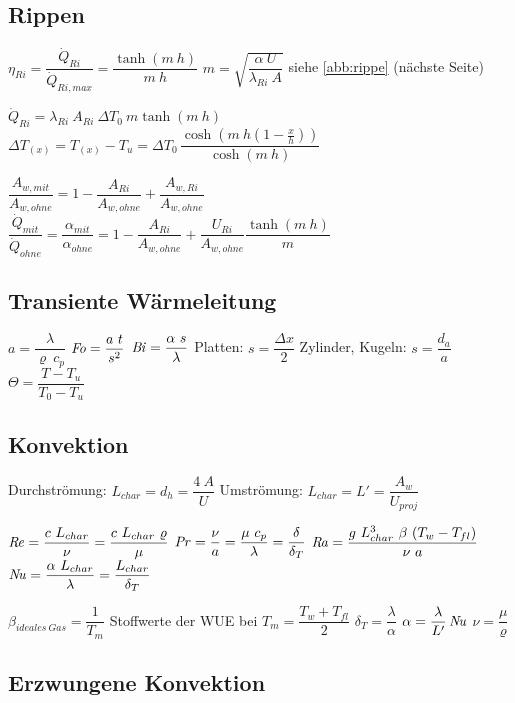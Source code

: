 \clearpage

\subsection{Rippen}
	$ \eta_{Ri} = \dfrac{\dot{Q}_{Ri}}{\dot{Q}_{Ri,max}} = \dfrac{\tanh(m\ h)}{m\ h} $
		\qquad $ m = \sqrt{\dfrac{\alpha\ U}{\lambda_{Ri}\ A}} $
		\qquad siehe \ref{abb:rippe} (nächste Seite)

	$ \dot{Q}_{Ri} = \lambda_{Ri}\ A_{Ri}\ \Delta T_0\ m \tanh(m\ h) $
		\qquad  $ \Delta T_{(x)} = T_{(x)} - T_u = \Delta T_0\, \dfrac{\cosh\left(m\ h \left(1- \frac{x}{h}\right)\right)}{\cosh(m\ h)} $

	$ \dfrac{A_{w,mit}}{A_{w,ohne}} = 1 - \dfrac{A_{Ri}}{A_{w,ohne}} + \dfrac{A_{w,Ri}}{A_{w,ohne}} $
		\qquad\qquad $ \dfrac{\dot{Q}_{mit}}{\dot{Q}_{ohne}} = \dfrac{\alpha_{mit}}{\alpha_{ohne}} = 1 - \dfrac{A_{Ri}}{A_{w,ohne}}  + \dfrac{U_{Ri}}{A_{w,ohne}} \dfrac{\tanh(m\ h)}{m}$

\subsection{Transiente Wärmeleitung}
	$ a = \dfrac{\lambda}{\varrho\ c_p} $
		\quad $ \operatorname{\mathit{F\kern-.20em o}} = \dfrac{a\ t}{s^2} $
		\quad $ \operatorname{\mathit{B\kern-.10em i}} = \dfrac{\alpha\ s}{\lambda} $
		\quad Platten: $ s = \dfrac{\Delta x}{2} $
		\quad Zylinder, Kugeln: $ s = \dfrac{d_a}{a} $
		\quad $\varTheta = \dfrac{T - T_u}{T_0 - T_u}  $

\subsection{Konvektion}
	Durchströmung: $ L_{char} = d_h = \dfrac{4\ A}{U} $ \qquad Umströmung: $ L_{char} = L' = \dfrac{A_w}{U_{proj}}$

	\vskip 3pt
	$ \operatorname{\mathit{R\kern-.10em e}} = \dfrac{c\ L_{char}}{\nu} = \dfrac{c\ L_{char}\ \varrho}{\mu} $
		\quad $ \operatorname{\mathit{P\kern-.10em r}} = \dfrac{\nu}{a} = \dfrac{\mu\ c_p}{\lambda} = \dfrac{\delta}{\delta_T} $
		\quad $ \operatorname{\mathit{R\kern-.10em a}} = \dfrac{g\ L_{char}^3\ \beta\ (T_w - T_{fl})}  {\nu\ a} $
		\quad $ \operatorname{\mathit{N\kern-.20em u}} = \dfrac{\alpha\ L_{char}}{\lambda} = \dfrac{L_{char}}{\delta_T} $

	\vskip 6pt
	$ \beta_{ideales~Gas} = \dfrac{1}{T_m} $
		\qquad Stoffwerte der WUE bei $ T_m = \dfrac{T_w + T_{fl}}{2} $
		\qquad $ \delta_T = \dfrac{\lambda}{\alpha} $
		\qquad $ \alpha = \dfrac{\lambda}{L'} \operatorname{\mathit{N\kern-.20em u}} $
		\qquad $ \nu = \dfrac{\mu}{\varrho} $


\subsection{Erzwungene Konvektion}
